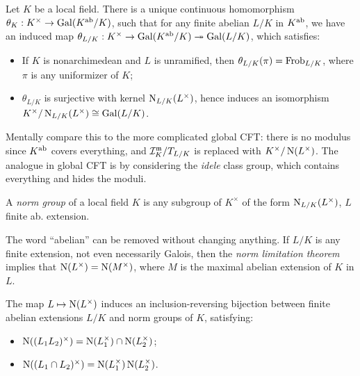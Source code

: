 \documentclass[11pt]{amsart}
\begin{document}
\begin{thm}
Let $K$ be a local field. There is a unique continuous homomorphism $\theta_K: K^\times \to \operatorname{Gal}(K^{\operatorname{ab}}/K)$, such that for any finite abelian $L/K$ in $K^{\operatorname{ab}}$, we have an induced map $\theta_{L/K}: K^\times \to \operatorname{Gal}(K^{\operatorname{ab}}/K) \twoheadrightarrow \operatorname{Gal}(L/K)$, which satisfies:
\begin{itemize}
\item If $K$ is nonarchimedean and $L$ is unramified, then $\theta_{L/K}(\pi) = \operatorname{Frob}_{L/K}$, where $\pi$ is any uniformizer of $K$;
\item $\theta_{L/K}$ is surjective with kernel $\operatorname{N}_{L/K}(L^\times)$, hence induces an isomorphism $K^\times/\operatorname{N}_{L/K}(L^\times) \cong \operatorname{Gal}(L/K)$.
\end{itemize}
\end{thm}

\begin{Rem}
    Mentally compare this to the more complicated global CFT: there is no modulus since $K^{\operatorname{ab}}$ covers everything, and $\mathcal{I}_K^{\mathfrak{m}}/T_{L/K}$ is replaced with $K^\times/\operatorname{N}(L^\times)$. The analogue in global CFT is by considering the \emph{idele} class group, which contains everything and hides the moduli.
\end{Rem}

\begin{defn}
    A \emph{norm group} of a local field $K$ is any subgroup of $K^\times$ of the form $\operatorname{N}_{L/K}(L^\times)$, $L$ finite ab. extension.
\end{defn}

\begin{Rem}
    The word ``abelian'' can be removed without changing anything. If $L/K$ is any finite extension, not even necessarily Galois, then the \emph{norm limitation theorem} implies that $\operatorname{N}(L^\times) = \operatorname{N}(M^\times)$, where $M$ is the maximal abelian extension of $K$ in $L$.
\end{Rem}

\begin{cor}
    The map $L\mapsto \operatorname{N}(L^\times)$ induces an inclusion-reversing bijection between finite abelian extensions $L/K$ and norm groups of $K$, satisfying:
    \begin{itemize}
        \item $\operatorname{N}((L_1L_2)^\times) = \operatorname{N}(L_1^\times)\cap \operatorname{N}(L_2^\times)$;
        \item $\operatorname{N}((L_1\cap L_2)^\times) = \operatorname{N}(L_1^\times)\operatorname{N}(L_2^\times)$.
    \end{itemize}
\end{cor}
\end{document}
